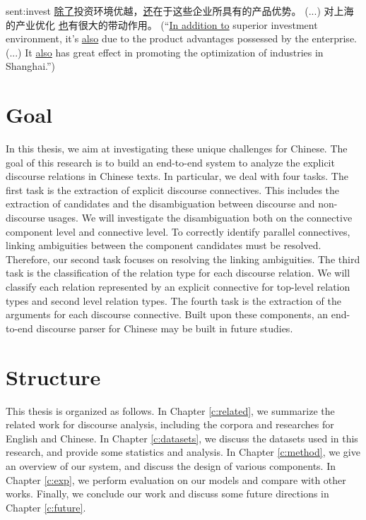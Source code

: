 \begin{sent}{sent:invest}{}
\underline{除了}投资环境优越，\underline{还}在于这些企业所具有的产品优势。
(...) 对上海的产业优化 \underline{也}有很大的带动作用。
(``\underline{In addition to}
superior investment environment, it's \underline{also} due to the product
advantages possessed by the enterprise. (...) It \underline{also} has
great effect in promoting the optimization of industries in Shanghai.'')
\end{sent}



%
%
\section{Goal}

In this thesis, we aim at investigating these unique challenges for Chinese.
The goal of this research is to build an end-to-end system to analyze
the explicit discourse relations in Chinese texts. In particular, we
deal with four tasks. The first task is the extraction of explicit discourse
connectives. This includes the extraction of candidates and the disambiguation
between discourse and non-discourse usages. We will investigate the disambiguation
both on the connective component level and connective level.
To correctly identify parallel connectives, linking ambiguities between
the component candidates must be resolved. Therefore, our second task
focuses on resolving the linking ambiguities.
The third task is the classification of the relation type for each discourse
relation.
We will classify each relation represented by an explicit connective for top-level
relation types and second level relation types.
The fourth task is the extraction of the arguments for each discourse connective.
Built upon these components, an end-to-end discourse parser for Chinese may
be built in future studies.

%
%
\section{Structure}
This thesis is organized as follows. In Chapter \ref{c:related}, we summarize
the related work for discourse analysis, including the corpora and researches for
English and Chinese. In Chapter \ref{c:datasets}, we discuss the datasets used in
this research, and provide some statistics and analysis. In Chapter \ref{c:method},
we give an overview of our system, and discuss the design of various components.
In Chapter \ref{c:exp}, we perform evaluation on our models and compare with
other works. Finally, we conclude our work and discuss some future directions in
Chapter \ref{c:future}.
